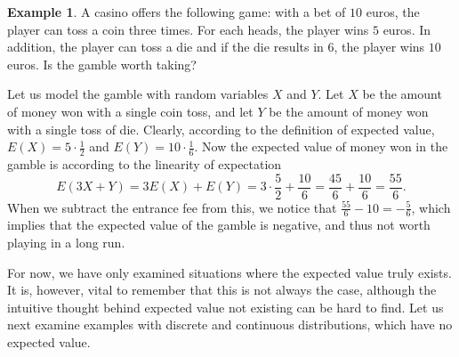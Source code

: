 \documentclass[12pt,a4paper,leqno]{report}
\theoremstyle{plain}
\theoremstyle{definition}
\newtheorem{esim}[equation]{Example}
\begin{document}
\begin{esim} \label{esim:expected_value_linearity}
A casino offers the following game: with a bet of $10$ euros, the player can toss a coin three times. For each heads, the player wins $5$ euros. In addition, the player can toss a die and if the die results in $6$, the player wins $10$ euros. Is the gamble worth taking?

Let us model the gamble with random variables $X$ and $Y$. Let $X$ be the amount of money won with a single coin toss, and let $Y$ be the amount of money won with a single toss of die. Clearly, according to the definition of expected value, $E(X) = 5 \cdot \frac{1}{2}$ and $E(Y) = 10 \cdot \frac{1}{6}$. Now the expected value of money won in the gamble is according to the linearity of expectation
\[
E(3X+Y) = 3E(X) + E(Y) = 3\cdot \frac{5}{2} + \frac{10}{6}= \frac{45}{6} + \frac{10}{6} = \frac{55}{6}. 
\]
When we subtract the entrance fee from this, we notice that $\frac{55}{6} - 10 = -\frac{5}{6}$, which implies that the expected value of the gamble is negative, and thus not worth playing in a long run.
\end{esim}

For now, we have only examined situations where the expected value truly exists. It is, however, vital to remember that this is not always the case, although the intuitive thought behind expected value not existing can be hard to find. Let us next examine examples with discrete and continuous distributions, which have no expected value.
\end{document}
